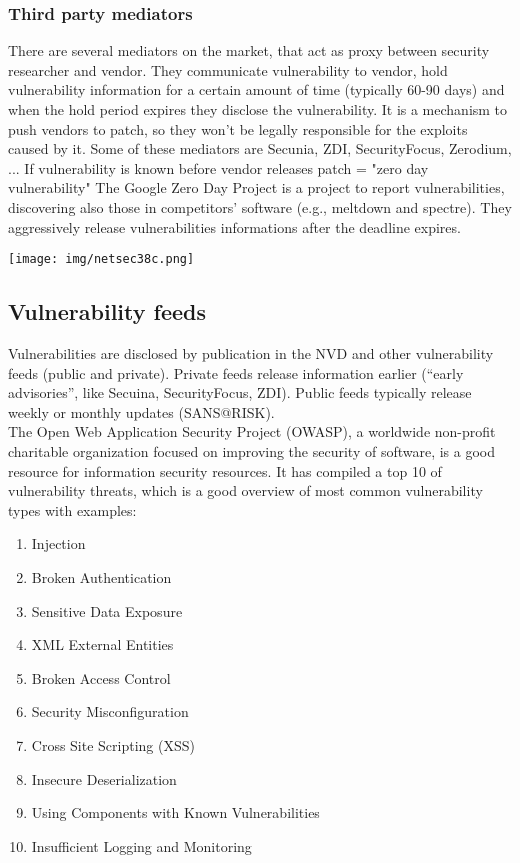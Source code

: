 \documentclass[a4paper, 10pt, titlepage]{article}
\begin{document}
\subsubsection*{Third party mediators}
There are several mediators on the market, that act as proxy between security researcher and vendor. They communicate vulnerability to vendor, hold vulnerability information for a certain amount of time (typically 60-90 days) and when the hold period expires they disclose the vulnerability. It is a mechanism to push vendors to patch, so they won't be legally responsible for the exploits caused by it. Some of these mediators are Secunia, ZDI, SecurityFocus, Zerodium, ... If vulnerability is known before vendor releases patch = "zero day vulnerability"
The Google Zero Day Project is a project to report vulnerabilities, discovering also those in competitors’ software (e.g., meltdown and spectre). They aggressively release vulnerabilities informations after the deadline expires.
\begin{center}
	\texttt{[image: img/netsec38c.png]}
\end{center}

\subsection*{Vulnerability feeds}
Vulnerabilities are disclosed by publication in the NVD and other vulnerability feeds (public and private). Private feeds release information earlier (“early advisories”, like Secuina, SecurityFocus, ZDI). Public feeds typically release weekly or monthly updates (SANS@RISK).\medskip\\
The Open Web Application Security Project (OWASP), a worldwide non-profit charitable organization focused on improving the security of software, is a good resource for information security resources. It has compiled a top 10 of vulnerability threats, which is a good overview of most common vulnerability types with examples:
\begin{small}
	\begin{enumerate}
		\item Injection
		\item Broken Authentication
		\item Sensitive Data Exposure
		\item XML External Entities
		\item Broken Access Control
		\item Security Misconfiguration
		\item Cross Site Scripting (XSS)
		\item Insecure Deserialization
		\item Using Components with Known Vulnerabilities
		\item Insufficient Logging and Monitoring
	\end{enumerate}
\end{small}
\end{document}
